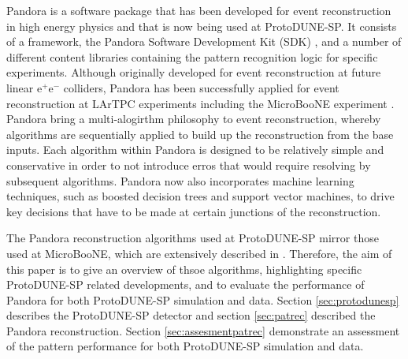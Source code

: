 Pandora is a software package that has been developed for event reconstruction in high energy physics and that is now being used at ProtoDUNE-SP.  It consists of a framework, the Pandora Software Development Kit (SDK) \cite{pandorasdk}, and a number of different content libraries containing the pattern recognition logic for specific experiments.  Although originally developed for event reconstruction at future linear $\text{e}^{+}\text{e}^{-}$ colliders, Pandora has been successfully applied for event reconstruction at LArTPC experiments including the MicroBooNE experiment \cite{pandorauboone}.  Pandora bring a multi-alogirthm philosophy to event reconstruction, whereby algorithms are sequentially applied to build up the reconstruction from the base inputs.  Each algorithm within Pandora is designed to be relatively simple and conservative in order to not introduce erros that would require resolving by subsequent algorithms.  Pandora now also incorporates machine learning techniques, such as boosted decision trees and support vector machines, to drive key decisions that have to be made at certain junctions of the reconstruction. 

The Pandora reconstruction algorithms used at ProtoDUNE-SP mirror those used at MicroBooNE, which are extensively described in \cite{pandorauboone}.  Therefore, the aim of this paper is to give an overview of thsoe algorithms, highlighting specific ProtoDUNE-SP related developments, and to evaluate the performance of Pandora for both ProtoDUNE-SP simulation and data.  Section \ref{sec:protodunesp} describes the ProtoDUNE-SP detector and section \ref{sec:patrec} described the Pandora reconstruction.  Section \ref{sec:assesmentpatrec} demonstrate an assessment of the pattern performance for both ProtoDUNE-SP simulation and data.  


